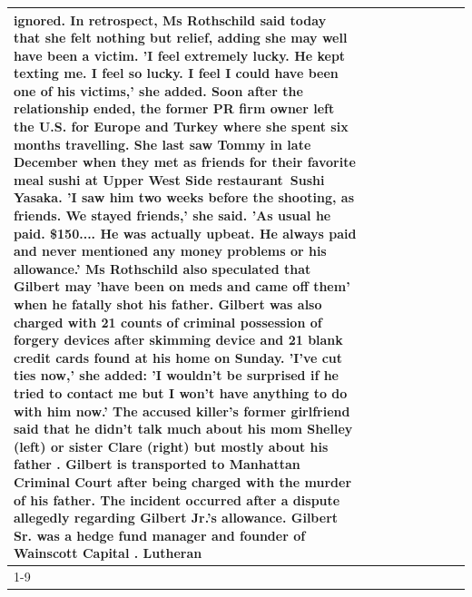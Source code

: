 \begin{table}[H]
\begin{tabular}{lllrlllll}
ignored. In retrospect, Ms Rothschild said today that she felt nothing but relief, adding she may well have been a victim. 'I feel extremely lucky. He kept texting me. I feel so lucky. I feel I could have been one of his victims,' she added. Soon after the relationship ended, the former PR firm owner left the U.S. for Europe and Turkey where she spent six months  travelling. She last saw Tommy in late December when they met as friends for their favorite meal sushi at Upper West Side restaurant Sushi Yasaka. 'I saw him two weeks before the shooting, as friends. We stayed friends,' she said. 'As usual he paid. \$150.... He was actually upbeat. He always paid and never mentioned any money problems or his allowance.' Ms Rothschild also speculated that Gilbert may 'have been on meds and came off them' when he fatally shot his father. Gilbert was also charged with 21 counts of criminal possession of forgery devices after skimming device and 21 blank credit cards found at his home on Sunday. 'I've cut ties now,' she added: 'I wouldn’t be surprised if he tried to contact me but I won’t have anything to do with him now.' The accused killer's former girlfriend said that he didn't talk much about his mom Shelley (left) or sister Clare (right) but mostly about his father . Gilbert is transported to Manhattan Criminal Court  after being charged with the murder of his father. The incident occurred after a dispute allegedly regarding Gilbert Jr.'s allowance. Gilbert Sr. was a hedge fund manager and founder of Wainscott Capital . Lutheran \\
\cline{1-9}

\end{tabular}
\end{table}
